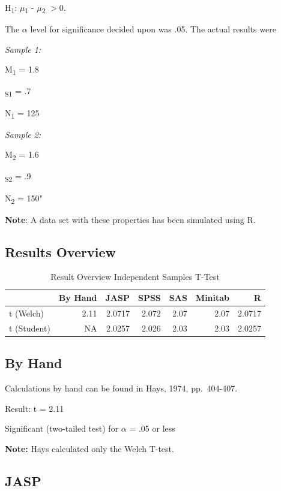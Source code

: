 \documentclass[
]{book}
\begin{document}
H\textsubscript{1}: \(\mu\)\textsubscript{1} - \(\mu\)\textsubscript{2} \(> 0\).

The \(\alpha\) level for significance decided upon was .05. The actual results were

\emph{Sample 1:}

M\textsubscript{1} = 1.8

\textsubscript{S1} = .7

N\textsubscript{1} = 125

\emph{Sample 2:}

M\textsubscript{2} = 1.6

\textsubscript{S2} = .9

N\textsubscript{2} = 150"

\textbf{Note}: A data set with these properties has been simulated using R.

\hypertarget{results-overview}{%
\subsection{Results Overview}\label{results-overview}}

\begin{table}

\caption{\label{tab:unnamed-chunk-9}Result Overview Independent Samples T-Test}
\centering
\begin{tabular}[t]{lrrrrrr}
\toprule
  & By Hand & JASP & SPSS & SAS & Minitab & R\\
\midrule
t (Welch) & 2.11 & 2.0717 & 2.072 & 2.07 & 2.07 & 2.0717\\
t (Student) & NA & 2.0257 & 2.026 & 2.03 & 2.03 & 2.0257\\
\bottomrule
\end{tabular}
\end{table}

\hypertarget{by-hand}{%
\subsection{By Hand}\label{by-hand}}

Calculations by hand can be found in Hays, 1974, pp.~404-407.

Result: t = 2.11

Significant (two-tailed test) for \(\alpha\) = .05 or less

\textbf{Note:} Hays calculated only the Welch T-test.

\hypertarget{jasp}{%
\subsection{JASP}\label{jasp}}
\end{document}
